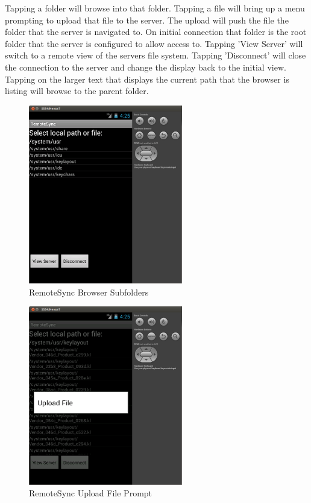 \documentclass[12pt]{article}
\begin{document}
Tapping a folder will browse into that folder. Tapping a file will bring up a menu prompting to upload that file to the server. The upload will push the file the folder that the server is navigated to. On initial connection that folder is the root folder that the server is configured to allow access to. Tapping 'View Server' will switch to a remote view of the servers file system. Tapping 'Disconnect' will close the connection to the server and change the display back to the initial view. Tapping on the larger text that displays the current path that the browser is listing will browse to the parent folder.

\begin{figure}[H]
\center
\includegraphics[width=0.6\textwidth]{deeper-browse-folder-view.png}
\caption{RemoteSync Browser Subfolders}
\end{figure}

\begin{figure}[H]
\center
\includegraphics[width=0.6\textwidth]{upload-file.png}
\caption{RemoteSync Upload File Prompt}
\end{figure}
\end{document}
